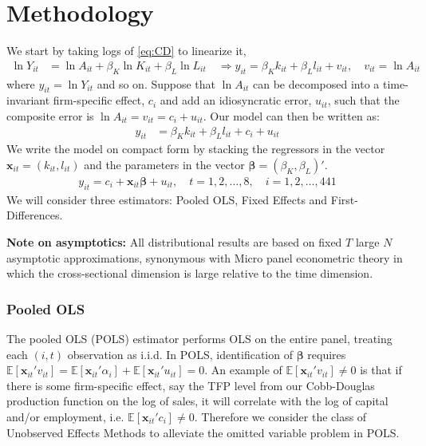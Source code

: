 \section{Methodology} \label{sec:methodology}

We start by taking logs of \eqref{eq:CD} to linearize it,
\begin{align*}
    \ln Y_{it} &= \ln A_{it} + \beta_K \ln K_{it} + \beta_L \ln L_{it} \quad \Longrightarrow
    y_{it} = \beta_K k_{it} + \beta_L l_{it} + v_{it}, \quad v_{it} = \ln A_{it}
\end{align*}
where $y_{it} = \ln Y_{it}$ and so on. Suppose that $\ln A_{it}$ can be decomposed into a time-invariant firm-specific effect, $c_i$ and add an idiosyncratic error, $u_{it}$, such that the composite error is $\ln A_{it}=v_{it} = c_i + u_{it}$. Our model can then be written as:
\begin{align*}
    y_{it} &= \beta_K k_{it} + \beta_L l_{it}+c_i + u_{it}
\end{align*}
We write the model on compact form by stacking the regressors in the vector $\bm{x}_{it} = (k_{it}, l_{it})$ and the parameters in the vector $\bm{\beta} = (\beta_K, \beta_L)'$.
\begin{align} \label{equationline}
    y_{it} = c_i + \bm{x}_{it} \bm{\beta} + u_{it}, \quad t=1,2,\ldots,8, \quad i=1,2,\ldots,441
\end{align}
We will consider three estimators: Pooled OLS, Fixed Effects and First-Differences.  

\textbf{Note on asymptotics:} All distributional results are based on fixed $T$ large $N$ asymptotic approximations, synonymous with Micro panel econometric theory in which the cross-sectional dimension is large relative to the time dimension. 

\subsubsection*{Pooled OLS}
The pooled OLS (POLS) estimator performs OLS on the entire panel, treating each $(i,t)$ observation as i.i.d. In POLS, identification of $\pmb{\beta}$ requires  $\mathbb{E}[\pmb{x}_{it}'v_{it}]=\mathbb{E}[\pmb{x}_{it}'\alpha_{i}]+\mathbb{E}[\pmb{x}_{it}'u_{it}]=0$.
An example of $\mathbb{E}[\pmb{x}_{it}'v_{it}]\neq0$ is that if there is some firm-specific effect, say the TFP level from our Cobb-Douglas production function on the log of sales, it will correlate with the log of capital and/or employment, i.e. $\mathbb{E}[\pmb{x}_{it}'c_{i}]\neq0$. Therefore we consider the class of Unobserved Effects Methods to alleviate the omitted variable problem in POLS.

